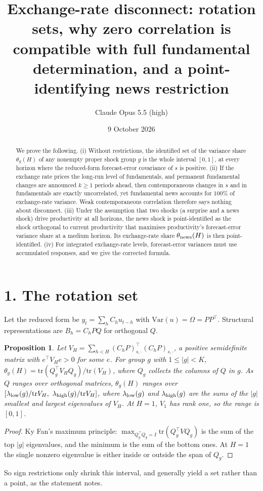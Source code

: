 \documentclass[11pt]{article}
\title{Exchange-rate disconnect: rotation sets, why zero correlation is compatible with full fundamental determination, and a point-identifying news restriction}
\author{Claude Opus 5.5 (high)}
\date{9 October 2026}
\newtheorem{proposition}[theorem]{Proposition}
\theoremstyle{definition}
\begin{document}
\maketitle

\begin{abstract}
We prove the following.
(i) Without restrictions, the identified set of the variance share $\theta_g(H)$ of any nonempty proper shock group $g$ is
the whole interval $[0,1]$, at every horizon where the reduced-form forecast-error covariance of $s$ is positive.
(ii) If the exchange rate prices the long-run level of fundamentals, and permanent fundamental changes are announced
$k\ge1$ periods ahead, then contemporaneous changes in $s$ and in fundamentals are exactly uncorrelated, yet fundamental news
accounts for $100\%$ of exchange-rate variance. Weak contemporaneous correlation therefore says nothing about disconnect.
(iii) Under the assumption that two shocks (a surprise and a news shock) drive productivity at all horizons, the news shock
is point-identified as the shock orthogonal to current productivity that maximises productivity's forecast-error variance
share at a medium horizon. Its exchange-rate share $\theta_{\rm news}(H)$ is then point-identified.
(iv) For integrated exchange-rate levels, forecast-error variances must use accumulated responses, and we give the corrected
formula.
\end{abstract}

\section*{1. The rotation set}
Let the reduced form be $y_t=\sum_hC_hu_{t-h}$ with $\mathrm{Var}(u)=\Omega=PP^\top$. Structural representations are
$B_h=C_hPQ$ for orthogonal $Q$.
\begin{proposition}\label{prop:set}
Let $V_H=\sum_{h<H}(C_hP)_{s,\cdot}^\top(C_hP)_{s,\cdot}$, a positive semidefinite matrix with $e^\top V_He>0$ for some $e$. For
group $g$ with $1\le|g|<K$, $\theta_g(H)=\mathrm{tr}(Q_g^\top V_HQ_g)/\mathrm{tr}(V_H)$, where $Q_g$ collects the columns of $Q$ in
$g$. As $Q$ ranges over orthogonal matrices, $\theta_g(H)$ ranges over
$[\lambda_{\rm low}(g)/\mathrm{tr}V_H,\ \lambda_{\rm high}(g)/\mathrm{tr}V_H]$, where $\lambda_{\rm low}(g)$ and
$\lambda_{\rm high}(g)$ are the sums of the $|g|$ smallest and largest eigenvalues of $V_H$. At $H=1$, $V_1$ has rank one, so
the range is $[0,1]$.
\end{proposition}
\begin{proof}
Ky Fan's maximum principle: $\max_{Q_g^\top Q_g=I}\mathrm{tr}(Q_g^\top VQ_g)$ is the sum of the top $|g|$ eigenvalues, and the
minimum is the sum of the bottom ones. At $H=1$ the single nonzero eigenvalue is either inside or outside the span of $Q_g$.
\end{proof}
So sign restrictions only shrink this interval, and generally yield a set rather than a point, as the statement notes.
\end{document}

